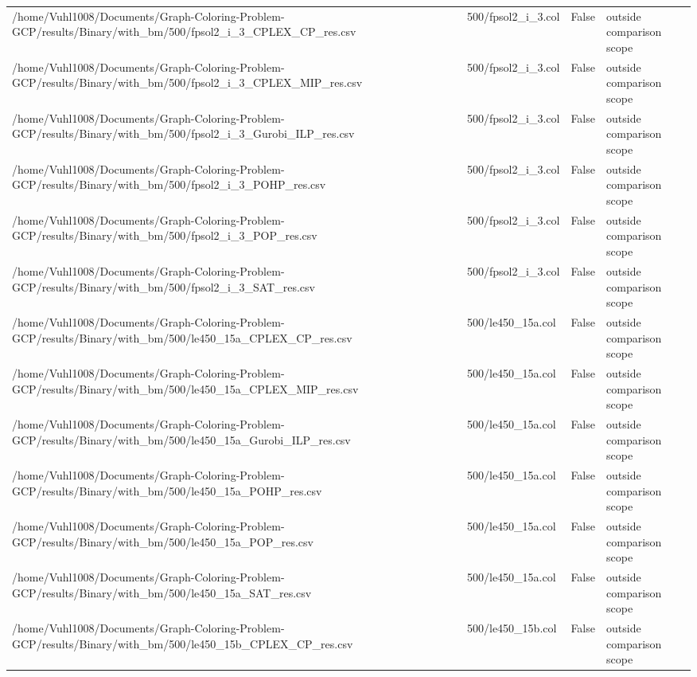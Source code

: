 \begin{table}[htbp]
\begin{tabular}{llll}
/home/Vuhl1008/Documents/Graph-Coloring-Problem-GCP/results/Binary/with\_bm/500/fpsol2\_i\_3\_CPLEX\_CP\_res.csv & 500/fpsol2\_i\_3.col & False & outside comparison scope \\
/home/Vuhl1008/Documents/Graph-Coloring-Problem-GCP/results/Binary/with\_bm/500/fpsol2\_i\_3\_CPLEX\_MIP\_res.csv & 500/fpsol2\_i\_3.col & False & outside comparison scope \\
/home/Vuhl1008/Documents/Graph-Coloring-Problem-GCP/results/Binary/with\_bm/500/fpsol2\_i\_3\_Gurobi\_ILP\_res.csv & 500/fpsol2\_i\_3.col & False & outside comparison scope \\
/home/Vuhl1008/Documents/Graph-Coloring-Problem-GCP/results/Binary/with\_bm/500/fpsol2\_i\_3\_POHP\_res.csv & 500/fpsol2\_i\_3.col & False & outside comparison scope \\
/home/Vuhl1008/Documents/Graph-Coloring-Problem-GCP/results/Binary/with\_bm/500/fpsol2\_i\_3\_POP\_res.csv & 500/fpsol2\_i\_3.col & False & outside comparison scope \\
/home/Vuhl1008/Documents/Graph-Coloring-Problem-GCP/results/Binary/with\_bm/500/fpsol2\_i\_3\_SAT\_res.csv & 500/fpsol2\_i\_3.col & False & outside comparison scope \\
/home/Vuhl1008/Documents/Graph-Coloring-Problem-GCP/results/Binary/with\_bm/500/le450\_15a\_CPLEX\_CP\_res.csv & 500/le450\_15a.col & False & outside comparison scope \\
/home/Vuhl1008/Documents/Graph-Coloring-Problem-GCP/results/Binary/with\_bm/500/le450\_15a\_CPLEX\_MIP\_res.csv & 500/le450\_15a.col & False & outside comparison scope \\
/home/Vuhl1008/Documents/Graph-Coloring-Problem-GCP/results/Binary/with\_bm/500/le450\_15a\_Gurobi\_ILP\_res.csv & 500/le450\_15a.col & False & outside comparison scope \\
/home/Vuhl1008/Documents/Graph-Coloring-Problem-GCP/results/Binary/with\_bm/500/le450\_15a\_POHP\_res.csv & 500/le450\_15a.col & False & outside comparison scope \\
/home/Vuhl1008/Documents/Graph-Coloring-Problem-GCP/results/Binary/with\_bm/500/le450\_15a\_POP\_res.csv & 500/le450\_15a.col & False & outside comparison scope \\
/home/Vuhl1008/Documents/Graph-Coloring-Problem-GCP/results/Binary/with\_bm/500/le450\_15a\_SAT\_res.csv & 500/le450\_15a.col & False & outside comparison scope \\
/home/Vuhl1008/Documents/Graph-Coloring-Problem-GCP/results/Binary/with\_bm/500/le450\_15b\_CPLEX\_CP\_res.csv & 500/le450\_15b.col & False & outside comparison scope \\

\end{tabular}
\end{table}
